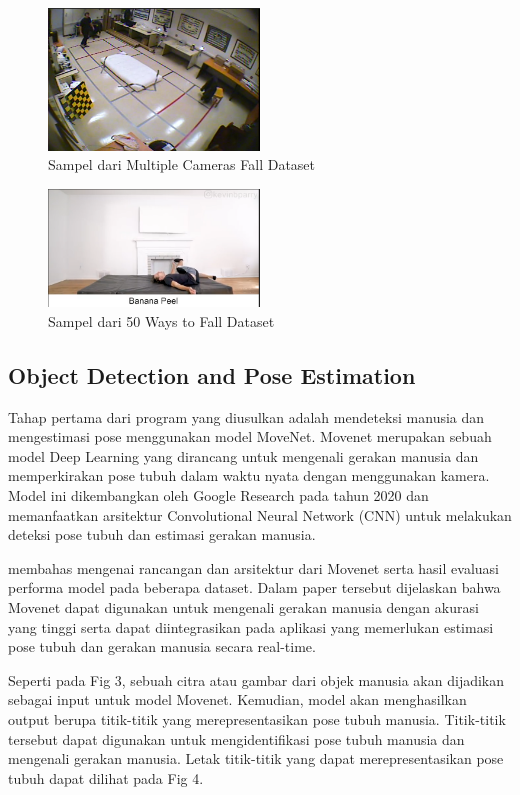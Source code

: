 \documentclass[conference]{IEEEtran}
\begin{document}
\begin{figure}[htbp]
\centerline{\includegraphics[width=0.5\textwidth]{figures/sample1.png}}
\caption{Sampel dari Multiple Cameras Fall Dataset}
\end{figure}

\begin{figure}[htbp]
\centerline{\includegraphics[width=0.5\textwidth]{figures/sample2.png}}
\caption{Sampel dari 50 Ways to Fall Dataset}
\end{figure}

\subsection{Object Detection and Pose Estimation}
Tahap pertama dari program yang diusulkan adalah mendeteksi manusia dan mengestimasi pose menggunakan model MoveNet. Movenet merupakan sebuah model Deep Learning yang dirancang untuk mengenali gerakan manusia dan memperkirakan pose tubuh dalam waktu nyata dengan menggunakan kamera. Model ini dikembangkan oleh Google Research pada tahun 2020 dan memanfaatkan arsitektur Convolutional Neural Network (CNN) untuk melakukan deteksi pose tubuh dan estimasi gerakan manusia.

\cite{b2} membahas mengenai rancangan dan arsitektur dari Movenet serta hasil evaluasi performa model pada beberapa dataset. Dalam paper tersebut dijelaskan bahwa Movenet dapat digunakan untuk mengenali gerakan manusia dengan akurasi yang tinggi serta dapat diintegrasikan pada aplikasi yang memerlukan estimasi pose tubuh dan gerakan manusia secara real-time.

Seperti pada Fig 3, sebuah citra atau gambar dari objek manusia akan dijadikan sebagai input untuk model Movenet. Kemudian, model akan menghasilkan output berupa titik-titik yang merepresentasikan pose tubuh manusia. Titik-titik tersebut dapat digunakan untuk mengidentifikasi pose tubuh manusia dan mengenali gerakan manusia. Letak titik-titik yang dapat merepresentasikan pose tubuh dapat dilihat pada Fig 4.
\end{document}
